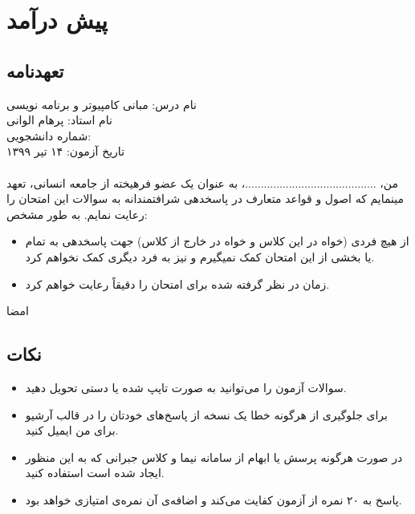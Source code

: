 \documentclass[../main.tex]{subfiles}
\begin{document}
\section{پیش درآمد}
\subsection{تعهدنامه}
نام درس:‌ مبانی کامپیوتر و برنامه نویسی\\
نام استاد:‌ پرهام الوانی\\
شماره دانشجویی:‌ \hspace{2em}\\
تاریخ آزمون:‌ ۱۴ تیر ۱۳۹۹

\paragraph{}
من، ..........................................، به عنوان یک عضو فرهیخته از جامعه انسانی، تعهد مینمایم که اصول و قواعد متعارف در پاسخدهی
شرافتمندانه به سوالات این امتحان را رعایت نمایم. به طور مشخص:

\begin{itemize}
    \item  از هیچ فردی (خواه در این کلاس و خواه در خارج از کلاس) جهت پاسخدهی به تمام یا بخشی از این امتحان کمک نمیگیرم
    و نیز به فرد دیگری کمک نخواهم کرد.
    \item زمان در نظر گرفته شده برای امتحان را دقیقاً رعایت خواهم کرد.
\end{itemize}

امضا

\subsection{نکات}
\begin{itemize}
    \item سوالات آزمون را می‌توانید به صورت تایپ شده یا دستی تحویل دهید.
    \item برای جلوگیری از هرگونه خطا یک نسخه از پاسخ‌های خودتان را در قالب آرشیو برای من ایمیل کنید.
    \item در صورت هرگونه پرسش یا ابهام از سامانه نیما و کلاس جبرانی که به این منظور ایجاد شده است استفاده کنید.
    \item پاسخ به ۲۰ نمره از آزمون کفایت می‌کند و اضافه‌ی آن نمره‌ی امتیازی خواهد بود.
\end{itemize}
\end{document}
